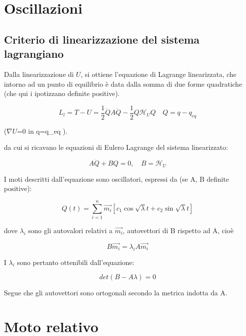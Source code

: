 \documentclass{article}
\begin{document}
            \section{Oscillazioni}
            \subsection{Criterio di linearizzazione del sistema lagrangiano}
            Dalla linearizzazione di $U$, si ottiene l'equazione di Lagrange linearizzata, che intorno ad un punto di equilibrio è data dalla somma di due forme quadratiche (che qui i ipotizzano definite positive).

            \begin{equation}
                L_l=T-U= \frac{1}{2}\dot{Q}A\dot{Q}- \frac{1}{2}Q\mathcal{H}_UQ \quad Q=q-q_{eq}
            \end{equation}

            ($\nabla$$U$=0 in q=q\_{eq} ).

        da cui si ricavano le equazioni di Eulero Lagrange del sistema linearizzato:

        \begin{equation}
            A\ddot{Q} + BQ = 0, \quad B = \mathcal{H}_U
        \end{equation}

        I moti descritti dall'equazione sono oscillatori, espressi da (se A, B definite positive):

        \begin{equation}
            Q(t)=\sum_{i=1}^n \vec{m_i}[c_1 \cos{\sqrt{\lambda}t}+c_2 \sin{\sqrt{\lambda}t}]
        \end{equation}

        dove $\lambda_i$ sono gli autovalori relativi a $\Vec{m_i}$, autovettori di B rispetto ad A, cioè

        \begin{equation}
            B \vec{m_i}=\lambda_iA\vec{m_i}
        \end{equation}

        I $\lambda_i$ sono pertanto ottenibili dall'equazione:

        \begin{equation}
            det(B-A\lambda)=0
        \end{equation}

        Segue che gli autovettori sono ortogonali secondo la metrica indotta da A.

        \section{Moto relativo}
\end{document}
